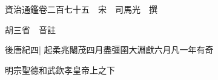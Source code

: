 






























































資治通鑑卷二百七十五　宋　司馬光　撰

胡三省　音註

後唐紀四|{
	起柔兆閹茂四月盡彊圉大淵獻六月凡一年有奇}


明宗聖德和武欽孝皇帝上之下

